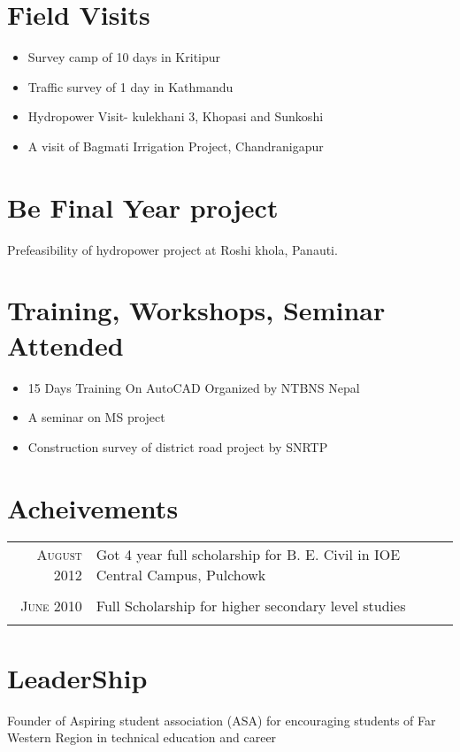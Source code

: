 \documentclass[a4paper,10pt]{article}
\begin{document}
\section{Field Visits}
\begin{itemize}
\item Survey camp of 10 days in Kritipur
\item Traffic survey of 1 day in Kathmandu
\item Hydropower Visit- kulekhani 3, Khopasi and Sunkoshi
\item A visit of Bagmati Irrigation Project, Chandranigapur
\end{itemize}

\section{Be Final Year project}
Prefeasibility of hydropower project at Roshi khola, Panauti.\\

\section{Training, Workshops, Seminar Attended}
\begin{itemize}
\item 15 Days Training On AutoCAD Organized by NTBNS Nepal
\item A seminar on MS project
\item Construction survey of district road project by SNRTP
\end{itemize}


\section{Acheivements}
\begin{tabular}{rl}	
 \textsc{August 2012}  & Got 4 year full scholarship for B. E. Civil in IOE Central Campus, Pulchowk \\\\
  \textsc{June 2010}  & Full Scholarship for higher secondary level studies \\\\
\end{tabular}

\section{LeaderShip}
Founder of Aspiring student association (ASA) for encouraging students of Far Western Region in technical education and career\\
\end{document}
